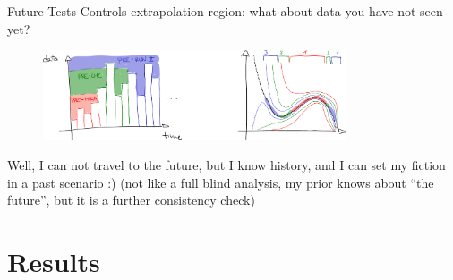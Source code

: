 \documentclass[9pt]{beamer}
\begin{document}
\begin{frame}{Future Tests}
    Controls extrapolation region: what about data you have not seen yet?
    \vspace*{10pt}

    \begin{figure}
        \centering
        \includegraphics[width=0.8\textwidth]{future-tests}
    \end{figure}

    Well, I can not travel to the future, but I know history, and I can set my
    fiction in a past scenario :)
    (not like a full blind analysis, my prior knows about \enquote{the future},
    but it is a further consistency check)
\end{frame}

\section{Results}
\end{document}
